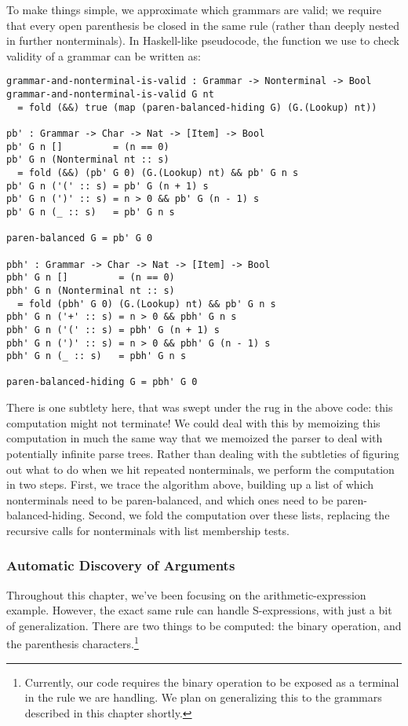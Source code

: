     To make things simple, we approximate which grammars are valid; we require that every open parenthesis be closed in the same rule (rather than deeply nested in further nonterminals).  In Haskell-like pseudocode, the function we use to check validity of a grammar can be written as:
\begin{verbatim}
grammar-and-nonterminal-is-valid : Grammar -> Nonterminal -> Bool
grammar-and-nonterminal-is-valid G nt
  = fold (&&) true (map (paren-balanced-hiding G) (G.(Lookup) nt))

pb' : Grammar -> Char -> Nat -> [Item] -> Bool
pb' G n []         = (n == 0)
pb' G n (Nonterminal nt :: s)
  = fold (&&) (pb' G 0) (G.(Lookup) nt) && pb' G n s
pb' G n ('(' :: s) = pb' G (n + 1) s
pb' G n (')' :: s) = n > 0 && pb' G (n - 1) s
pb' G n (_ :: s)   = pb' G n s

paren-balanced G = pb' G 0

pbh' : Grammar -> Char -> Nat -> [Item] -> Bool
pbh' G n []         = (n == 0)
pbh' G n (Nonterminal nt :: s)
  = fold (pbh' G 0) (G.(Lookup) nt) && pb' G n s
pbh' G n ('+' :: s) = n > 0 && pbh' G n s
pbh' G n ('(' :: s) = pbh' G (n + 1) s
pbh' G n (')' :: s) = n > 0 && pbh' G (n - 1) s
pbh' G n (_ :: s)   = pbh' G n s

paren-balanced-hiding G = pbh' G 0
\end{verbatim}
    
    There is one subtlety here, that was swept under the rug in the above code: this computation might not terminate!  We could deal with this by memoizing this computation in much the same way that we memoized the parser to deal with potentially infinite parse trees.  Rather than dealing with the subtleties of figuring out what to do when we hit repeated nonterminals, we perform the computation in two steps.  First, we trace the algorithm above, building up a list of which nonterminals need to be paren-balanced, and which ones need to be paren-balanced-hiding.  Second, we fold the computation over these lists, replacing the recursive calls for nonterminals with list membership tests.
    
  \subsubsection{Automatic Discovery of Arguments}
    Throughout this chapter, we've been focusing on the arithmetic-expression example.  However, the exact same rule can handle S-expressions, with just a bit of generalization.  There are two things to be computed: the binary operation, and the parenthesis characters.\footnote{Currently, our code requires the binary operation to be exposed as a terminal in the rule we are handling.  We plan on generalizing this to the grammars described in this chapter shortly.}
    
